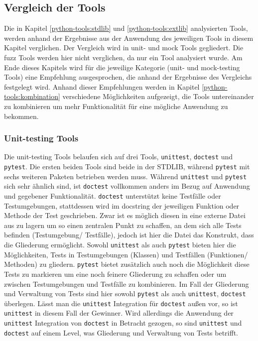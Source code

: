 \subsection{Vergleich der Tools}\label{python-tools:vergleich}

Die in Kapitel \ref{python-tools:stdlib} und \ref{python-tools:extlib}
analysierten Tools, werden anhand der Ergebnisse aus der Anwendung des
jeweiligen Tools in diesem Kapitel verglichen. Der Vergleich wird in unit- und
\gls{mock} Tools gegliedert. Die \gls{fuzz} Tools werden hier
nicht verglichen, da nur ein Tool analysiert wurde. Am Ende dieses Kapitels 
wird für die jeweilige Kategorie (unit- und mock-testing Tools) eine Empfehlung 
ausgesprochen, die anhand der Ergebnisse des Vergleichs festgelegt wird. Anhand 
dieser Empfehlungen werden in Kapitel \ref{python-tools:kombination} 
verschiedene Möglichkeiten aufgezeigt, die Tools untereinander zu kombinieren 
um mehr Funktionalität für eine mögliche Anwendung zu bekommen.

\subsubsection{Unit-testing Tools}\label{python-tools:vergleich:unit}
Die unit-testing Tools belaufen sich auf drei Tools, \lstinline{unittest},
\lstinline{doctest} und \lstinline{pytest}. Die ersten beiden Tools sind beide
in der STDLIB, während \lstinline{pytest} mit sechs weiteren Paketen betrieben
werden muss. Während \lstinline{unittest} und \lstinline{pytest} sich sehr
ähnlich sind, ist \lstinline{doctest} vollkommen anders im Bezug auf Anwendung
und gegebener Funktionalität. \lstinline{doctest} unterstützt keine Testfälle
oder Testumgebungen, stattdessen wird im \gls{docstring} der jeweiligen
Funktion oder Methode der Test geschrieben. Zwar ist es möglich diesen in eine
externe Datei aus zu lagern um so einen zentralen Punkt zu schaffen, an dem sich
alle Tests befinden (Testumgebung/ Testfälle), jedoch ist hier die Datei das
Konstrukt, dass die Gliederung ermöglicht. Sowohl \lstinline{unittest} als auch
\lstinline{pytest} bieten hier die Möglichkeiten, Tests in Testumgebungen
(Klassen) und Testfällen (Funktionen/ Methoden) zu gliedern. \lstinline{pytest}
bietet zusätzlich auch noch die Möglichkeit diese Tests zu markieren um eine
noch feinere Gliederung zu schaffen oder um zwischen Testumgebungen und 
Testfälle zu kombinieren. Im Fall der Gliederung und Verwaltung von Tests sind 
hier sowohl \lstinline{pytest} als auch \lstinline{unittest}, 
\lstinline{doctest} überlegen. Lässt man die \lstinline{unittest} Integration 
für \lstinline{doctest} außen vor, so ist \lstinline{unittest} in diesem Fall 
der Gewinner. Wird allerdings die Anwendung der \lstinline{unittest} 
Integration von \lstinline{doctest} in Betracht gezogen, so sind 
\lstinline{unittest} und \lstinline{doctest} auf einem Level, was Gliederung 
und Verwaltung von Tests betrifft.

